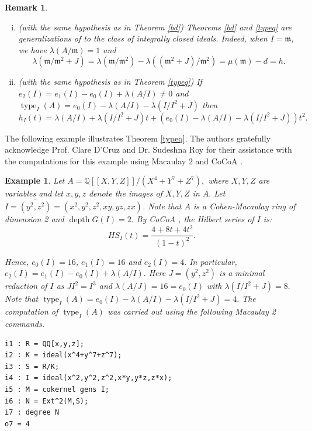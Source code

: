\documentclass[11pt]{amsart}
\theoremstyle{plain}
\newtheorem{remark}[theorem]{Remark}
\newtheorem{example}[theorem]{Example}
\newcommand{\depth}{\operatorname{depth}}
\newcommand{\type}{\operatorname{type}}
\theoremstyle{plain}
\begin{document}
\begin{remark}  \normalfont 
\begin{enumerate} [(i)]
    \item \textit{(with the same hypothesis as in Theorem \ref{bd})}
   Theorems \ref{bd} and \ref{typeq} are generalizations of \cite[Proposition~2.21 and Theorem~3.1]{ankit} to the class of integrally closed ideals. Indeed, when $I=\mathfrak m$, we have
$\lambda(A/\mathfrak m)=1$ and $$\lambda(\mathfrak m/\mathfrak m^2+J)
= \lambda(\mathfrak m/\mathfrak m^2)
- \lambda((\mathfrak m^2+J)/\mathfrak m^2)
= \mu(\mathfrak m)-d
= h.$$

\item  \textit{(with the same hypothesis as in Theorem \ref{typeq})}  If $e_{2}(I)=e_{1}(I)-e_{0}(I)+\lambda(A/I) \neq 0$ and $\type_I(A) = e_{0}(I)-\lambda(A/I)-\lambda(I/I^{2}+J)$ then $$h_I(t)=\lambda(A/I)+\lambda(I/I^2+J)t+(e_0(I)-\lambda(A/I)-\lambda(I/I^2+J))t^2.$$
\end{enumerate}
\end{remark}



The following example illustrates Theorem \ref{typeq}. The authors gratefully acknowledge Prof. Clare D'Cruz and Dr. Sudeshna Roy for their assistance with the computations for this example using Macaulay 2 \cite{macaulay2} and CoCoA \cite{cocoa}.


\begin{example} \normalfont
   Let $A=\mathbb Q[[X,Y,Z]]/(X^4+Y^7+Z^7),$ where $X,Y,Z$ are variables and   let $x,y,z$ denote the images of $X,Y,Z$ in $A.$ Let $I= \overline{(y^2,z^2)}=(x^2,y^2,z^2,xy,yz,zx)$. Note that  $A$ is a Cohen-Macaulay ring of dimension 2 and $\depth G(I)=2.$ By CoCoA \cite{cocoa}, the Hilbert series of $I$ is:
   \[HS_{I}(t)=\frac{4 + 8t + 4t^2}{(1-t)^{2}}.\]

   Hence, $e_{0}(I)=16$, $e_{1}(I)=16$ and $e_{2}(I)=4.$ In particular, $e_{2}(I)=e_{1}(I)-e_{0}(I)+\lambda(A/I).$ Here $J=(y^2,z^2)$ is a minimal reduction of $I$ as $JI^2=I^3$ and $\lambda(A/J)=16=e_{0}(I)$ 
with   $\lambda(I/I^2+J)=8.$  Note that $\type_{I}(A)= e_{0}(I)-\lambda(A/I)-\lambda(I/I^2+J)=4.$ The computation of $\type_{I}(A)$
 was carried out using the following Macaulay 2 \cite{macaulay2} commands.  
\begin{lstlisting}
i1 : R = QQ[x,y,z];
i2 : K = ideal(x^4+y^7+z^7);
i3 : S = R/K;
i4 : I = ideal(x^2,y^2,z^2,x*y,y*z,z*x);
i5 : M = cokernel gens I;
i6 : N = Ext^2(M,S);
i7 : degree N
o7 = 4
\end{lstlisting}
\end{example}
\end{document}
